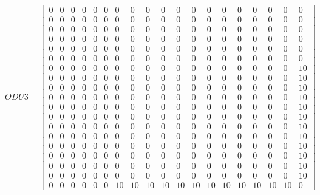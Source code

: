 \[
ODU3=
  \begin{bmatrix}
    0 & 0 & 0 & 0 & 0 & 0 & 0 & 0 & 0 & 0 & 0 & 0 & 0 & 0 & 0 & 0 & 0 & 0 & 0 \\
    0 & 0 & 0 & 0 & 0 & 0 & 0 & 0 & 0 & 0 & 0 & 0 & 0 & 0 & 0 & 0 & 0 & 0 & 0 \\
    0 & 0 & 0 & 0 & 0 & 0 & 0 & 0 & 0 & 0 & 0 & 0 & 0 & 0 & 0 & 0 & 0 & 0 & 0 \\
    0 & 0 & 0 & 0 & 0 & 0 & 0 & 0 & 0 & 0 & 0 & 0 & 0 & 0 & 0 & 0 & 0 & 0 & 0 \\
    0 & 0 & 0 & 0 & 0 & 0 & 0 & 0 & 0 & 0 & 0 & 0 & 0 & 0 & 0 & 0 & 0 & 0 & 0 \\
    0 & 0 & 0 & 0 & 0 & 0 & 0 & 0 & 0 & 0 & 0 & 0 & 0 & 0 & 0 & 0 & 0 & 0 & 0 \\
    0 & 0 & 0 & 0 & 0 & 0 & 0 & 0 & 0 & 0 & 0 & 0 & 0 & 0 & 0 & 0 & 0 & 0 & 10 \\
    0 & 0 & 0 & 0 & 0 & 0 & 0 & 0 & 0 & 0 & 0 & 0 & 0 & 0 & 0 & 0 & 0 & 0 & 10 \\
    0 & 0 & 0 & 0 & 0 & 0 & 0 & 0 & 0 & 0 & 0 & 0 & 0 & 0 & 0 & 0 & 0 & 0 & 10 \\
    0 & 0 & 0 & 0 & 0 & 0 & 0 & 0 & 0 & 0 & 0 & 0 & 0 & 0 & 0 & 0 & 0 & 0 & 10 \\
    0 & 0 & 0 & 0 & 0 & 0 & 0 & 0 & 0 & 0 & 0 & 0 & 0 & 0 & 0 & 0 & 0 & 0 & 10 \\
    0 & 0 & 0 & 0 & 0 & 0 & 0 & 0 & 0 & 0 & 0 & 0 & 0 & 0 & 0 & 0 & 0 & 0 & 10 \\
    0 & 0 & 0 & 0 & 0 & 0 & 0 & 0 & 0 & 0 & 0 & 0 & 0 & 0 & 0 & 0 & 0 & 0 & 10 \\
    0 & 0 & 0 & 0 & 0 & 0 & 0 & 0 & 0 & 0 & 0 & 0 & 0 & 0 & 0 & 0 & 0 & 0 & 10 \\
    0 & 0 & 0 & 0 & 0 & 0 & 0 & 0 & 0 & 0 & 0 & 0 & 0 & 0 & 0 & 0 & 0 & 0 & 10 \\
    0 & 0 & 0 & 0 & 0 & 0 & 0 & 0 & 0 & 0 & 0 & 0 & 0 & 0 & 0 & 0 & 0 & 0 & 10 \\
    0 & 0 & 0 & 0 & 0 & 0 & 0 & 0 & 0 & 0 & 0 & 0 & 0 & 0 & 0 & 0 & 0 & 0 & 10 \\
    0 & 0 & 0 & 0 & 0 & 0 & 0 & 0 & 0 & 0 & 0 & 0 & 0 & 0 & 0 & 0 & 0 & 0 & 10 \\
    0 & 0 & 0 & 0 & 0 & 0 & 10 & 10 & 10 & 10 & 10 & 10 & 10 & 10 & 10 & 10 & 10 & 10 & 0
  \end{bmatrix}
\]


